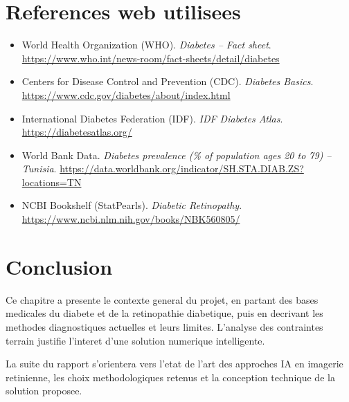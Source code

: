 \section*{References web utilisees}
\begin{itemize}
    \item World Health Organization (WHO). \textit{Diabetes -- Fact sheet}.\newline
    \url{https://www.who.int/news-room/fact-sheets/detail/diabetes}
    \item Centers for Disease Control and Prevention (CDC). \textit{Diabetes Basics}.\newline
    \url{https://www.cdc.gov/diabetes/about/index.html}
    \item International Diabetes Federation (IDF). \textit{IDF Diabetes Atlas}.\newline
    \url{https://diabetesatlas.org/}
    \item World Bank Data. \textit{Diabetes prevalence (\% of population ages 20 to 79) -- Tunisia}.\newline
    \url{https://data.worldbank.org/indicator/SH.STA.DIAB.ZS?locations=TN}
    \item NCBI Bookshelf (StatPearls). \textit{Diabetic Retinopathy}.\newline
    \url{https://www.ncbi.nlm.nih.gov/books/NBK560805/}
\end{itemize}

\section{Conclusion}
Ce chapitre a presente le contexte general du projet, en partant des bases medicales du diabete
et de la retinopathie diabetique, puis en decrivant les methodes diagnostiques actuelles et leurs limites.
L'analyse des contraintes terrain justifie l'interet d'une solution numerique intelligente.

La suite du rapport s'orientera vers l'etat de l'art des approches IA en imagerie retinienne,
les choix methodologiques retenus et la conception technique de la solution proposee.
